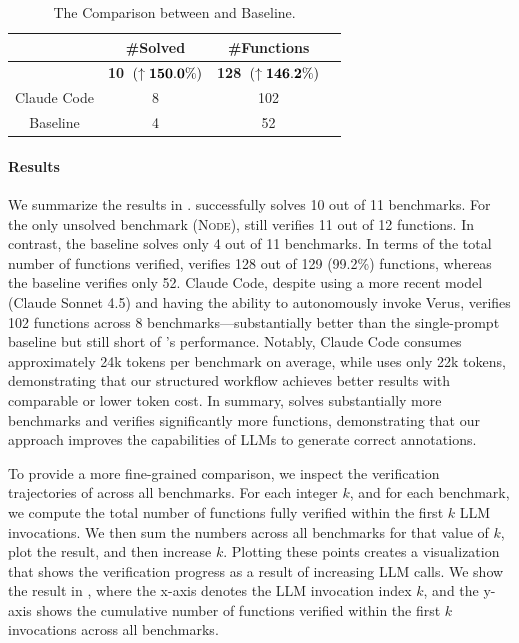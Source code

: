 \setlength{\tabcolsep}{8pt}
\begin{table}[t]
  \centering
  \caption{The Comparison between \toolname{} and Baseline.}
  \label{tab:workflow-vs-baseline}
  \begin{small}
    \begin{tabular}{cccc}
      \toprule
       & \textbf{\#Solved} & \textbf{\#Functions} \\
      \midrule
      \toolname{} & \textbf{10~$(\bf \uparrow 150.0\%)$} & \textbf{128~$(\bf \uparrow 146.2\%)$}  \\
      Claude Code & 8 & 102 \\
      {\sc Baseline} & 4 & 52 \\
      \bottomrule
    \end{tabular}
  \end{small}
\end{table}

\paragraph{Results}
We summarize the results in . \toolname{} successfully solves 10 out of 11 benchmarks. For the only unsolved benchmark (\textsc{Node}), \toolname{} still verifies 11 out of 12 functions. In contrast, the baseline solves only 4 out of 11 benchmarks. In terms of the total number of functions verified, \toolname{} verifies 128 out of 129 (99.2\%) functions, whereas the baseline verifies only 52. Claude Code, despite using a more recent model (Claude Sonnet 4.5) and having the ability to autonomously invoke Verus, verifies 102 functions across 8 benchmarks---substantially better than the single-prompt baseline but still short of \toolname{}'s performance. Notably, Claude Code consumes approximately 24k tokens per benchmark on average, while \toolname{} uses only 22k tokens, demonstrating that our structured workflow achieves better results with comparable or lower token cost. In summary, \toolname{} solves substantially more benchmarks and verifies significantly more functions, demonstrating that our approach improves the capabilities of LLMs to generate correct annotations.%

To provide a more fine-grained comparison, we inspect the verification trajectories of \toolname{} across all benchmarks. For each integer $k$, and for each benchmark, we compute the total number of functions fully verified within the first $k$ LLM invocations.  We then sum the numbers across all benchmarks for that value of $k$, plot the result, and then increase $k$.  Plotting these points creates a visualization that shows the verification progress as a result of increasing LLM calls. We show the result in , where the x-axis denotes the LLM invocation index $k$, and the y-axis shows the cumulative number of functions verified within the first $k$ invocations across all benchmarks.

